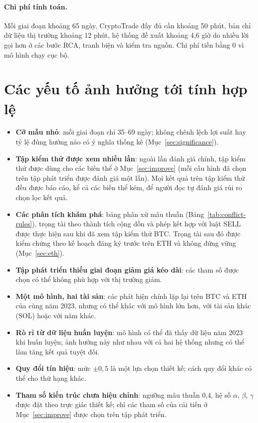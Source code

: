 \paragraph{Chi phí tính toán.} Mỗi giai đoạn khoảng 65 ngày, CryptoTrade đầy đủ cần khoảng 50 phút, bản chỉ dữ liệu thị
trường khoảng 12 phút, hệ thống đề xuất khoảng 4,6 giờ do nhiều lời gọi hơn ở các bước RCA, tranh biện và kiểm tra nguồn.
Chi phí tiền bằng 0 vì mô hình chạy cục bộ.

\section{Các yếu tố ảnh hưởng tới tính hợp lệ}
\begin{itemize}
  \item \textbf{Cỡ mẫu nhỏ}: mỗi giai đoạn chỉ 35--69 ngày; không chênh lệch lợi suất hay tỷ lệ đúng hướng nào có ý nghĩa
  thống kê (Mục~\ref{sec:significance}).
  \item \textbf{Tập kiểm thử được xem nhiều lần}: ngoài lần đánh giá chính, tập kiểm thử được dùng cho các biến thể ở
  Mục~\ref{sec:improve} (mỗi cấu hình đã chọn trên tập phát triển được đánh giá một lần). Mọi kết quả trên tập kiểm thử
  đều được báo cáo, kể cả các biến thể kém, để người đọc tự đánh giá rủi ro chọn lọc kết quả.
  \item \textbf{Các phân tích khám phá}: bảng phân xử mâu thuẫn (Bảng~\ref{tab:conflict-rules}), trọng tài theo thành
  tích cộng dồn và phép kết hợp với luật SELL được thực hiện sau khi đã xem tập kiểm thử BTC. Trọng tài sau đó được kiểm
  chứng theo kế hoạch đăng ký trước trên ETH và không đứng vững (Mục~\ref{sec:eth}).
  \item \textbf{Tập phát triển thiếu giai đoạn giảm giá kéo dài}: các tham số được chọn có thể không phù hợp với thị
  trường giảm.
  \item \textbf{Một mô hình, hai tài sản}: các phát hiện chính lặp lại trên BTC và ETH của cùng năm 2023, nhưng có thể
  khác với mô hình lớn hơn, với tài sản khác (SOL) hoặc với năm khác.
  \item \textbf{Rò rỉ từ dữ liệu huấn luyện}: mô hình có thể đã thấy dữ liệu năm 2023 khi huấn luyện; ảnh hưởng này như
  nhau với cả hai hệ thống nhưng có thể làm tăng kết quả tuyệt đối.
  \item \textbf{Quy đổi tín hiệu}: mức $\pm0{,}5$ là một lựa chọn thiết kế; cách quy đổi khác có thể cho thứ hạng khác.
  \item \textbf{Tham số kiến trúc chưa hiệu chỉnh}: ngưỡng mâu thuẫn 0,4, hệ số $\alpha$, $\beta$, $\gamma$ được đặt theo
  trực giác thiết kế; chỉ các tham số của cải tiến ở Mục~\ref{sec:improve} được chọn trên tập phát triển.
\end{itemize}
